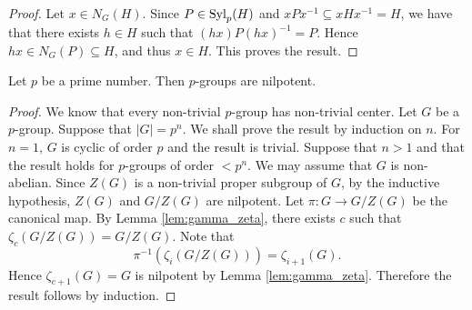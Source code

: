 \begin{proof}
	Let $x\in N_G(H)$. Since $P\in\mathrm{Syl}_p(H)$ and $xPx^{-1}\subseteq xHx^{-1}=H$, we have that there exists
	$h\in H$ such that $(hx)P(hx)^{-1}=P$. Hence $hx\in
	N_G(P)\subseteq H$, and thus $x\in H$. This proves the result. 
\end{proof}

%

\begin{lemma}\label{pgroup}
	Let $p$ be a prime number. Then $p$-groups are nilpotent.
\end{lemma}

\begin{proof}
    We know that every non-trivial $p$-group has non-trivial center. Let $G$ be a $p$-group. Suppose that $|G|=p^n$. We shall prove the result by induction on $n$. For $n=1$, $G$ is cyclic of order $p$ and the result is trivial. Suppose that $n>1$ and that the result holds for $p$-groups of order $<p^n$. We may assume that $G$ is non-abelian. Since $Z(G)$ is a non-trivial proper subgroup of $G$, by the inductive hypothesis, $Z(G)$ and $G/Z(G)$ are nilpotent. Let $\pi\colon G\rightarrow G/Z(G)$ be the canonical map. By Lemma \ref{lem:gamma_zeta}, there exists $c$ such that $\zeta_c(G/Z(G))=G/Z(G)$. Note that
    \[ \pi^{-1}(\zeta_i(G/Z(G)))=\zeta_{i+1}(G).\]
    Hence $\zeta_{c+1}(G)=G$ is nilpotent by Lemma \ref{lem:gamma_zeta}. Therefore the result follows by induction. 
\end{proof}

